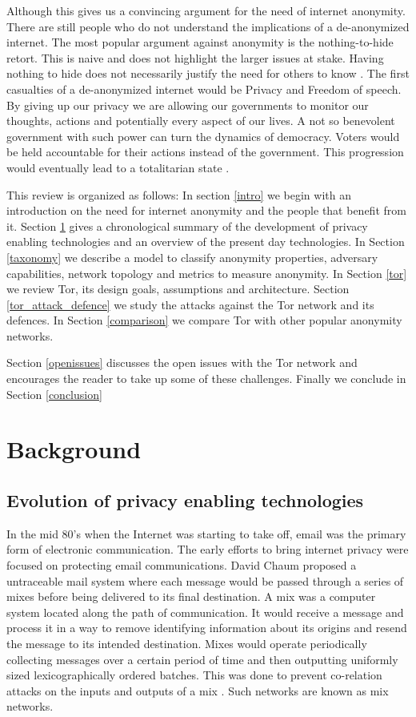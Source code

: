 \documentclass{llncs}
\begin{document}
Although this gives us a convincing argument for the need of internet anonymity. There are still people who do not understand the implications of a de-anonymized internet. The most popular argument against anonymity is the nothing-to-hide retort. This is naive and does not highlight the larger issues at stake. Having nothing to hide does not necessarily justify the need for others to know \cite{thechronicle}. 
The first casualties of a de-anonymized internet would be Privacy and Freedom of speech. By giving up our privacy we are allowing our governments to monitor our thoughts, actions and potentially every aspect of our lives. A not so benevolent government with such power can turn the dynamics of democracy. Voters would be held accountable for their actions instead of the government. This progression would eventually lead to a totalitarian state \cite{privateinternetaccess}. 

This review is organized as follows: In section \ref{intro} we begin with an introduction on the need for internet anonymity and the people that benefit from it. Section \ref{background} gives a chronological summary of the development of privacy enabling technologies and an overview of the present day technologies. In Section \ref{taxonomy} we describe a model to classify anonymity properties, adversary capabilities, network topology and metrics to measure anonymity. 
In Section \ref{tor} we review Tor, its design goals, assumptions and architecture. Section \ref{tor_attack_defence} we study the attacks against the Tor network and its defences. In Section \ref{comparison} we compare Tor with other popular anonymity networks.

Section \ref{openissues} discusses the open issues with the Tor network and encourages the reader to take up some of these challenges. Finally we conclude in Section \ref{conclusion}

\section{Background} \label{background}
\subsection{Evolution of privacy enabling technologies}

In the mid 80's when the Internet was starting to take off, email was the primary form of electronic communication. The early efforts to bring internet privacy were focused on protecting email communications. David Chaum proposed a untraceable mail system where each message would be passed through a series of mixes before being delivered to its final destination. A mix was a computer system located along the path of communication. It would receive a message and process it in a way to remove identifying information about its origins and resend the message to its intended destination. Mixes would operate periodically collecting messages over a certain period of time and then outputting uniformly sized lexicographically ordered batches. This was done to prevent co-relation attacks on the inputs and outputs of a mix \cite{chaum-mix}. Such networks are known as mix networks.
\end{document}
